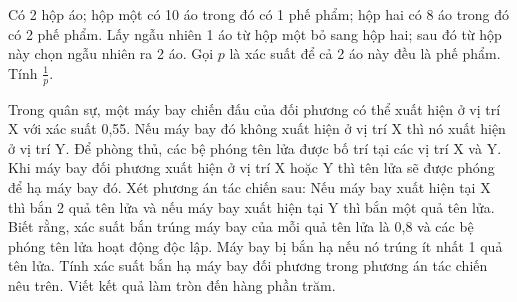 \begin{ex}%
    Có 2 hộp áo; hộp một có 10 áo trong đó có 1 phế phẩm; hộp hai có 8 áo trong đó có 2 phế phẩm. Lấy ngẫu nhiên 1 áo từ hộp một bỏ sang hộp hai; sau đó từ hộp này chọn ngẫu nhiên ra 2 áo. Gọi $p$ là xác suất để cả 2 áo này đều là phế phẩm. Tính $\frac{1}{p}$.
\end{ex}
\begin{ex}%
    Trong quân sự, một máy bay chiến đấu của đối phương có thể xuất hiện ở vị trí X với xác suất 0,55. Nếu máy bay đó không xuất hiện ở vị trí X thì nó xuất hiện ở vị trí Y. Để phòng thủ, các bệ phóng tên lửa được bố trí tại các vị trí X và Y. Khi máy bay đối phương xuất hiện ở vị trí X hoặc Y thì tên lửa sẽ được phóng để hạ máy bay đó.
    Xét phương án tác chiến sau: Nếu máy bay xuất hiện tại X thì bắn 2 quả tên lửa và nếu máy bay xuất hiện tại Y thì bắn một quả tên lửa. Biết rằng, xác suất bắn trúng máy bay của mỗi quả tên lửa là 0,8 và các bệ phóng tên lửa hoạt động độc lập. Máy bay bị bắn hạ nếu nó trúng ít nhất 1 quả tên lửa. Tính xác suất bắn hạ máy bay đối phương trong phương án tác chiến nêu trên. Viết kết quả làm tròn đến hàng phần trăm.
\end{ex}
